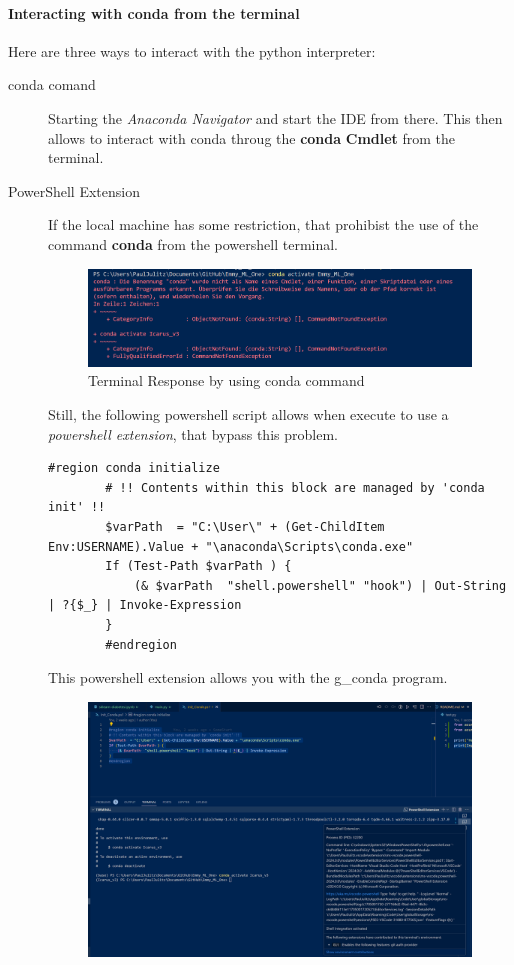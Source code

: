 \paragraph{Interacting with conda from the terminal}
Here are three ways to interact with the python interpreter:
\begin{description}
	\item[conda comand] Starting the \textit{Anaconda Navigator} and start the \gls{IDE} from there. This then allows to interact with conda throug the \textbf{conda} \textbf{Cmdlet} from the terminal.

	\item[PowerShell Extension] If the local machine has some restriction, that prohibist the use of the command \textbf{conda} from the powershell terminal.
	\begin{figure}[H]
		\centering
		\includegraphics[scale = 0.3]{attachment/chapter_AML/Scc023}
		\caption{Terminal Response by using conda command}
	\end{figure}
	Still, the following powershell script allows when execute to use a \textit{powershell extension}, that bypass this problem.
	\begin{lstlisting}[style=CMD, caption={.ps1 script}, captionpos=b]
		#region conda initialize
		# !! Contents within this block are managed by 'conda init' !!
		$varPath  = "C:\User\" + (Get-ChildItem Env:USERNAME).Value + "\anaconda\Scripts\conda.exe"
		If (Test-Path $varPath ) {
			(& $varPath  "shell.powershell" "hook") | Out-String | ?{$_} | Invoke-Expression
		}
		#endregion
	\end{lstlisting}
	This powershell extension allows you with the \gls{g_conda} program.
	\begin{figure}[H]
		\centering
		\includegraphics[scale = 0.2]{attachment/chapter_AML/Scc026}

\end{figure}
\end{description}
